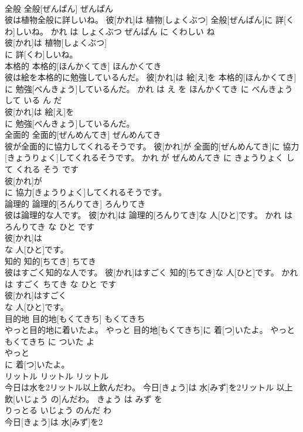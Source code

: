 \documentclass[8pt]{extreport}
\begin{document}
\begin{CJK}{UTF8}{min}
\\	全般	全般[ぜんぱん]	ぜんぱん	
\\	彼は植物全般に詳しいね。	彼[かれ]は 植物[しょくぶつ] 全般[ぜんぱん]に 詳[くわ]しいね。	かれ は しょくぶつ ぜんぱん に くわしい ね	
\\	彼[かれ]は 植物[しょくぶつ]
\\	に 詳[くわ]しいね。			
\\	本格的	本格的[ほんかくてき]	ほんかくてき	
\\	彼は絵を本格的に勉強しているんだ。	彼[かれ]は 絵[え]を 本格的[ほんかくてき]に 勉強[べんきょう]しているんだ。	かれ は え を ほんかくてき に べんきょう して いる ん だ	
\\	彼[かれ]は 絵[え]を
\\	に 勉強[べんきょう]しているんだ。			
\\	全面的	全面的[ぜんめんてき]	ぜんめんてき	
\\	彼が全面的に協力してくれるそうです。	彼[かれ]が 全面的[ぜんめんてき]に 協力[きょうりょく]してくれるそうです。	かれ が ぜんめんてき に きょうりょく して くれる そう です	
\\	彼[かれ]が
\\	に 協力[きょうりょく]してくれるそうです。			
\\	論理的	論理的[ろんりてき]	ろんりてき	
\\	彼は論理的な人です。	彼[かれ]は 論理的[ろんりてき]な 人[ひと]です。	かれ は ろんりてき な ひと です	
\\	彼[かれ]は
\\	な 人[ひと]です。			
\\	知的	知的[ちてき]	ちてき	
\\	彼はすごく知的な人です。	彼[かれ]はすごく 知的[ちてき]な 人[ひと]です。	かれ は すごく ちてき な ひと です	
\\	彼[かれ]はすごく
\\	な 人[ひと]です。			
\\	目的地	目的地[もくてきち]	もくてきち	
\\	やっと目的地に着いたよ。	やっと 目的地[もくてきち]に 着[つ]いたよ。	やっと もくてきち に ついた よ	
\\	やっと
\\	に 着[つ]いたよ。			
\\	リットル	リットル	リットル	
\\	今日は水を2リットル以上飲んだわ。	今日[きょう]は 水[みず]を2リットル 以上飲[いじょう の]んだわ。	きょう は みず を 
\\	りっとる いじょう のんだ わ	
\\	今日[きょう]は 水[みず]を2

\end{CJK}
\end{document}
